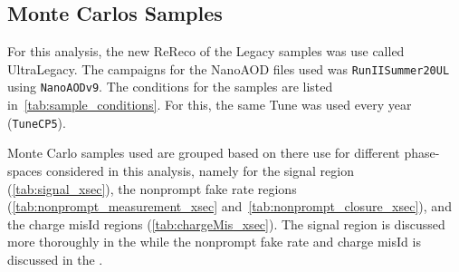 \subsection{Monte Carlos Samples}
For this analysis, the new ReReco of the Legacy samples was use called UltraLegacy. The campaigns for the NanoAOD files used  was \texttt{RunIISummer20UL} using \texttt{NanoAODv9}. The conditions for the samples are listed in~\ref{tab:sample_conditions}. For this, the same Tune was used every year (\texttt{TuneCP5}).

Monte Carlo samples used are grouped based on there use for different phase-spaces considered in this analysis, namely for the signal region (\ref{tab:signal_xsec}), the nonprompt fake rate regions (\ref{tab:nonprompt_measurement_xsec} and~\ref{tab:nonprompt_closure_xsec}), and the charge misId regions (\ref{tab:chargeMis_xsec}). The signal region is discussed more thoroughly in the  while the nonprompt fake rate and charge misId is discussed in the .


